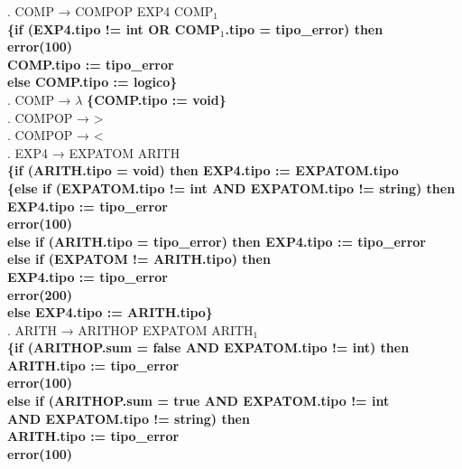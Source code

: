 \begin{tabbing}
    . COMP → COMPOP EXP4 COMP$_1$\\
    \>                     \>\textbf{\{if (EXP4.tipo != int OR COMP$_1$.tipo = tipo\_error) then}\\
    \>                     \> \> \textbf{error(100)}\\
    \>                     \> \> \textbf{COMP.tipo := tipo\_error}\\
    \>                     \> \textbf{else COMP.tipo := logico\}}\\
    . COMP → $\lambda$ \textbf{\{COMP.tipo := void\}}\\
    . COMPOP → >\\
    . COMPOP → <\\
    . EXP4 → EXPATOM ARITH\\
    \>                     \>\textbf{\{if (ARITH.tipo = void) then EXP4.tipo := EXPATOM.tipo}\\
    \>                     \>\textbf{\{else if (EXPATOM.tipo != int AND EXPATOM.tipo != string) then}\\
    \> \> \> \textbf{EXP4.tipo := tipo\_error}\\
    \> \> \> \textbf{error(100)}\\
    \>                     \> \textbf{else if (ARITH.tipo = tipo\_error) then EXP4.tipo := tipo\_error}\\
    \>                     \> \textbf{else if (EXPATOM != ARITH.tipo) then}\\ 
    \> \> \> \textbf{EXP4.tipo := tipo\_error}\\
    \>                     \> \> \textbf{error(200)}\\
    \>                     \> \textbf{else EXP4.tipo := ARITH.tipo\}}\\
    . ARITH → ARITHOP EXPATOM ARITH$_1$\\
    \>                     \>\textbf{\{if (ARITHOP.sum = false AND EXPATOM.tipo != int) then}\\
    \>                     \> \> \textbf{ARITH.tipo := tipo\_error}\\
    \>                     \> \> \textbf{error(100)}\\
    \> \>\textbf{else if (ARITHOP.sum = true AND EXPATOM.tipo != int}\\
    \> \> \>\textbf{AND EXPATOM.tipo != string) then}\\     
    \> \> \> \> \textbf{ARITH.tipo := tipo\_error}\\
    \> \> \> \> \textbf{error(100)}\\

\end{tabbing}
